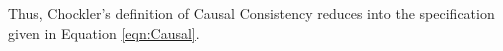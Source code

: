 \documentclass[acmlarge, ,11pt]{acmart}
\begin{document}
 Thus, Chockler's definition of Causal Consistency reduces into the specification given in Equation \ref{eqn:Causal}.
\end{document}
